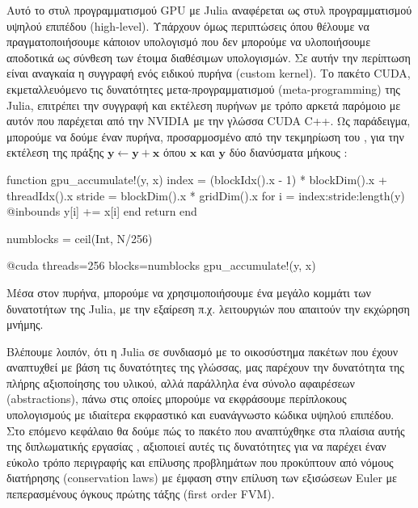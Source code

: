 Αυτό το στυλ προγραμματισμού GPU με Julia αναφέρεται ως στυλ προγραμματισμού υψηλού επιπέδου (high-level).
Υπάρχουν όμως περιπτώσεις όπου θέλουμε να πραγματοποιήσουμε κάποιον υπολογισμό που δεν μπορούμε να υλοποιήσουμε αποδοτικά ως σύνθεση των έτοιμα διαθέσιμων υπολογισμών.
Σε αυτήν την περίπτωση είναι αναγκαία η συγγραφή ενός ειδικού πυρήνα (custom kernel).
Το πακέτο CUDA, εκμεταλλευόμενο τις δυνατότητες μετα-προγραμματισμού (meta-programming) της Julia, επιτρέπει την συγγραφή και εκτέλεση πυρήνων με τρόπο αρκετά παρόμοιο με αυτόν που παρέχεται από την NVIDIA με την γλώσσα CUDA C++.
Ως παράδειγμα, μπορούμε να δούμε έναν πυρήνα, προσαρμοσμένο από την τεκμηρίωση του , για την εκτέλεση της πράξης $\mathbf{y} \leftarrow \mathbf{y} + \mathbf{x}$ όπου $\mathbf{x}$ και $\mathbf{y}$ δύο διανύσματα μήκους :

{\large
\begin{jllisting}[language=julia,style=jlcodestyle]
function gpu_accumulate!(y, x)
    index = (blockIdx().x - 1) * blockDim().x + threadIdx().x
    stride = blockDim().x * gridDim().x
    for i = index:stride:length(y)
        @inbounds y[i] += x[i]
    end
    return
end

numblocks = ceil(Int, N/256)

@cuda threads=256 blocks=numblocks gpu_accumulate!(y, x)
\end{jllisting}
}

Μέσα στον πυρήνα, μπορούμε να χρησιμοποιήσουμε ένα μεγάλο κομμάτι των δυνατοτήτων της Julia, με την εξαίρεση π.χ. λειτουργιών που απαιτούν την εκχώρηση μνήμης.

Βλέπουμε λοιπόν, ότι η Julia σε συνδιασμό με το οικοσύστημα πακέτων που έχουν αναπτυχθεί με βάση τις δυνατότητες της γλώσσας, μας παρέχουν την δυνατότητα της πλήρης αξιοποίησης του υλικού, αλλά παράλληλα ένα σύνολο αφαιρέσεων (abstractions), πάνω στις οποίες μπορούμε να εκφράσουμε περίπλοκους υπολογισμούς με ιδιαίτερα εκφραστικό και ευανάγνωστο κώδικα υψηλού επιπέδου.
Στο επόμενο κεφάλαιο θα δούμε πώς το πακέτο που αναπτύχθηκε στα πλαίσια αυτής της διπλωματικής εργασίας , αξιοποιεί αυτές τις δυνατότητες για να παρέχει έναν εύκολο τρόπο περιγραφής και επίλυσης προβλημάτων που προκύπτουν από νόμους διατήρησης (conservation laws) με έμφαση στην επίλυση των εξισώσεων Euler με πεπερασμένους όγκους πρώτης τάξης (first order FVM).

